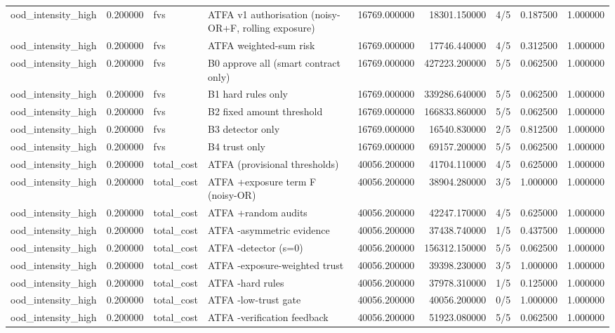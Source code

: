 \begin{tabular}{lrllrrlrr}
ood\_intensity\_high & 0.200000 & fvs & ATFA v1 authorisation (noisy-OR+F, rolling exposure) & 16769.000000 & 18301.150000 & 4/5 & 0.187500 & 1.000000 \\
ood\_intensity\_high & 0.200000 & fvs & ATFA weighted-sum risk & 16769.000000 & 17746.440000 & 4/5 & 0.312500 & 1.000000 \\
ood\_intensity\_high & 0.200000 & fvs & B0 approve all (smart contract only) & 16769.000000 & 427223.200000 & 5/5 & 0.062500 & 1.000000 \\
ood\_intensity\_high & 0.200000 & fvs & B1 hard rules only & 16769.000000 & 339286.640000 & 5/5 & 0.062500 & 1.000000 \\
ood\_intensity\_high & 0.200000 & fvs & B2 fixed amount threshold & 16769.000000 & 166833.860000 & 5/5 & 0.062500 & 1.000000 \\
ood\_intensity\_high & 0.200000 & fvs & B3 detector only & 16769.000000 & 16540.830000 & 2/5 & 0.812500 & 1.000000 \\
ood\_intensity\_high & 0.200000 & fvs & B4 trust only & 16769.000000 & 69157.200000 & 5/5 & 0.062500 & 1.000000 \\
ood\_intensity\_high & 0.200000 & total\_cost & ATFA (provisional thresholds) & 40056.200000 & 41704.110000 & 4/5 & 0.625000 & 1.000000 \\
ood\_intensity\_high & 0.200000 & total\_cost & ATFA +exposure term F (noisy-OR) & 40056.200000 & 38904.280000 & 3/5 & 1.000000 & 1.000000 \\
ood\_intensity\_high & 0.200000 & total\_cost & ATFA +random audits & 40056.200000 & 42247.170000 & 4/5 & 0.625000 & 1.000000 \\
ood\_intensity\_high & 0.200000 & total\_cost & ATFA -asymmetric evidence & 40056.200000 & 37438.740000 & 1/5 & 0.437500 & 1.000000 \\
ood\_intensity\_high & 0.200000 & total\_cost & ATFA -detector (s=0) & 40056.200000 & 156312.150000 & 5/5 & 0.062500 & 1.000000 \\
ood\_intensity\_high & 0.200000 & total\_cost & ATFA -exposure-weighted trust & 40056.200000 & 39398.230000 & 3/5 & 1.000000 & 1.000000 \\
ood\_intensity\_high & 0.200000 & total\_cost & ATFA -hard rules & 40056.200000 & 37978.310000 & 1/5 & 0.125000 & 1.000000 \\
ood\_intensity\_high & 0.200000 & total\_cost & ATFA -low-trust gate & 40056.200000 & 40056.200000 & 0/5 & 1.000000 & 1.000000 \\
ood\_intensity\_high & 0.200000 & total\_cost & ATFA -verification feedback & 40056.200000 & 51923.080000 & 5/5 & 0.062500 & 1.000000 \\

\end{tabular}
